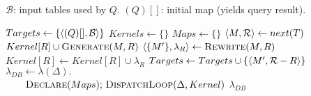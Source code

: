 \begin{algorithm}
\caption{$\compile(Q)$}
\label{alg:compile}
\begin{codebox}
\zi {}
\zi {}
\zi {}
\zi \>$\mathcal{B}$: input tables used by $Q$.
\zi \>$(Q)[]$: initial map (yields query result).
\end{codebox}
\begin{algorithmic}[1]
\STATE $Targets \leftarrow \{{\langle(Q)[],\mathcal{B}\rangle}\}$
\STATE $Kernels \leftarrow \{\}$
\STATE $Maps \leftarrow \{\}$
	\STATE ${\langle M,\mathcal{R}\rangle} \leftarrow next(T)$
		\STATE $Kernel[R] \cup \mbox{\sc Generate}(M,R)$
	\ELSE
			\STATE ${\langle\{M'\}, \lambda_R\rangle} \leftarrow \mbox{\sc Rewrite}(M,R)$
			\STATE $Kernel[R] \leftarrow Kernel[R] \cup \lambda_R$
			\STATE $Targets \leftarrow Targets \cup \{{\langle M',\mathcal{R}-R\rangle}\}$
		\ENDFOR
	\ENDIF
\ENDWHILE
\STATE $\lambda_{DB} \leftarrow \lambda(\Delta).$\\
$\qquad \mbox{\sc Declare}(Maps)\mbox{; \sc
DispatchLoop}(\Delta, Kernel)$
\RETURN $\lambda_{DB}$
\end{algorithmic}
\end{algorithm}


